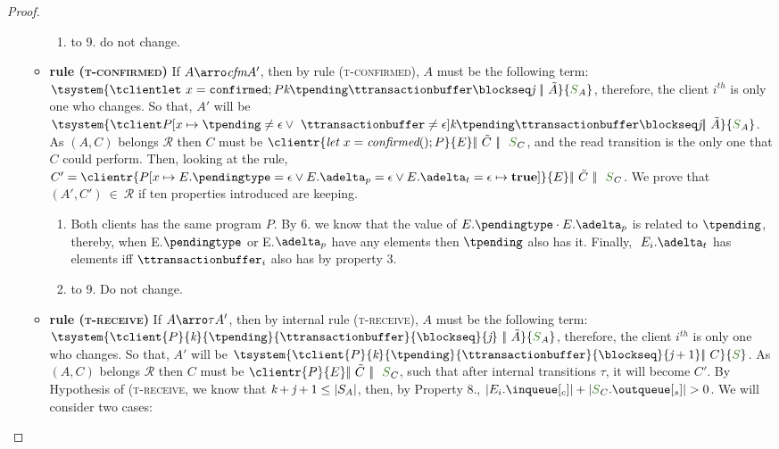 \documentclass[envcountsect,runningheads,orivec]{llncs}
\begin{document}
\begin{proof}
\begin{itemize}
\begin{itemize}
\begin{enumerate}
							\item to 9. do not change.
						\end{enumerate}
					\item {\bf rule (\textsc{t-confirmed})} If $A \arroi{\confirmedtran} A'$, then by rule (\textsc{\footnotesize{t-confirmed}}), $A$ must be the following term: $ \tsystem{\tclienti{\tconfirmedins{x}}{\tknown}{\tpending}{\ttransactionbuffer}{\tsent}{\treceivebuffer}\ \bigpar\ \tilde{A}}{\queuemessage_A}$, therefore, the client $i^{th}$ is only one who changes. So that, $A'$ will be $\tsystem{\tclienti{\update{\tprogram}{x}{\tpending \neq \emptysequence \vee\ \ttransactionbuffer \neq \epsilon}}{\tknown}{\tpending}{\ttransactionbuffer}{\tsent}{\treceivebuffer}\bigpar\ \tilde{A}}{\queuemessage_A}$. As $(A,C)$ belongs $\mathcal{R}$ then $C$ must be $\clientr{\confirmedins{x}}{\stateclient} \bigpar\ \tilde{C} \ \bigpar\ \ \queuemessage_C$, and the read transition is the only one that $C$ could perform.
				Then, looking at the rule, $C' = \clientr{\update{P}{x \mapsto E.\pending = \epsilon \lor E.\pushbuffer = \epsilon \lor E.\transactionbuffer = \epsilon}{\textbf{true}}}{\stateclient} \bigpar\ \tilde{C} \ \bigpar\ \ \queuemessage_C$. We prove that $(A',C') \ \in \ \mathcal{R}$ if ten properties introduced are keeping.				
					\begin{enumerate}
						\item Both clients has the same program $P$. By 6. we know that the value of $E.\pending \cdot E.\pushbuffer$ is related to $\tpending$, thereby, when E.$\pending$ or E.$\pushbuffer$ have any elements then $\tpending$ also has it. Finally, $\ E_{i}.\transactionbuffer$ has elements iff $\ttransactionbuffer_i$ also has by property 3.
						\item to 9. Do not change.
					\end{enumerate}
					\item {\bf rule (\textsc{t-receive})} If $A \arroi{\tau} A'$, then by internal rule (\textsc{\footnotesize{t-receive}}), $A$ must be the following term: $\tsystem{\tclient{\tprogram}{\tknown}{\tpending}{\ttransactionbuffer}{\tsent}{\treceivebuffer}\ \bigpar\ \tilde{A}}{\queuemessage_A}$, therefore, the client $i^{th}$ is only one who changes. So that, $A'$ will be $\tsystem{\tclient{\tprogram}{\tknown}{\tpending}{\ttransactionbuffer}{\tsent}{\treceivebuffer + 1}\bigpar\ C}{\queuemessage}$. As	$(A,C)$ belongs $\mathcal{R}$ then $C$ must be $\clientr{\tprogram}{\stateclient} \bigpar\ \tilde{C} \ \bigpar\ \ \queuemessage_C$, such that after internal transitions $\tau$, it will become $C'$. By Hypothesis of (\textsc{\footnotesize{t-receive}}, we know that $\textit{k} + \textit{j} + 1 \leq \text{\textbar} S_A \text{\textbar}$, then, by Property 8., $|E_{i}.\inclient| + |\queuemessage_C.\outserver| > 0$. We will consider two cases:
						

\end{itemize}
\end{itemize}
\end{proof}
\end{document}
